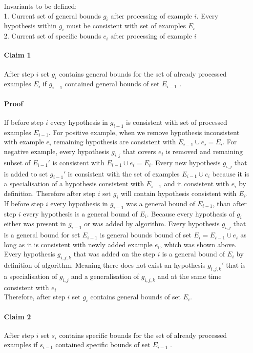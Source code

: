Invariants to be defined: 
\[\]
1. Current set of general bounds $g_i$ after processing of example $i$. Every hypothesis within $g_i$ must be consistent with set of examples $E_i$
\[\]
2. Current set of specific bounds $c_i$ after processing of example $i$

\paragraph*{Claim 1}
After step $i$ set $g_i$ contains general bounds for the set of already processed examples $E_i$ if $g_{i-1}$ contained general bounds of set $E_{i-1}$ .

\paragraph*{Proof}
If before step $i$ every hypothesis in $g_{i-1}$ is consistent with set of processed examples $E_{i-1}$. For positive example, when we remove hypothesis inconsistent with example $e_i$ remaining hypothesis are consistent with $E_{i-1} \cup e_i = E_i$. For negative example, every hypothesis $g_{i,j}$ that covers $e_i$ is removed and remaining subset of $E_{i-1}'$ is consistent with  $E_{i-1} \cup e_i = E_i$. Every new hypothesis $g_{i,j}$ that is added to set $g_{i-1}'$ is consistent with the set of examples $E_{i-1} \cup e_i$ because it is a specialisation of a hypothesis consistent with $E_{i-1}$ and it consistent with $e_i$ by definition. Therefore after step $i$ set $g_i$ will contain hypothesis consistent with $E_i$.
\[\]
If before step $i$ every hypothesis in $g_{i-1}$ was a general bound of $E_{i-1}$, than after step $i$ every hypothesis is a general bound of $E_i$. Because every hypothesis of $g_i$ either was present in $g_{i-1}$ or was added by algorithm. Every hypothesis $g_{i, j}$ that is a general bound for set $E_{i-1}$ is general bounds bound of set $E_{i} = E_{i-1} \cup e_i$ as long as it is consistent with newly added example $e_i$, which was shown above. 
\[\]
Every hypothesis $g_{i,j,k}$ that was added on the step $i$ is a general bound of $E_i$ by definition of algorithm. Meaning there does not exist an hypothesis $g_{i,j,k}'$ that is a specialisation of $g_{i,j}$ and a generalisation of $g_{i,j,k}$ and at the same time consistent with $e_i$
\[\]
Therefore, after step $i$ set $g_i$ contains general bounds of set $E_i$.
\paragraph*{Claim 2}
After step $i$ set $s_i$ contains specific bounds for the set of already processed examples if $s_{i-1}$ contained specific bounds of set $E_{i-1}$ .
